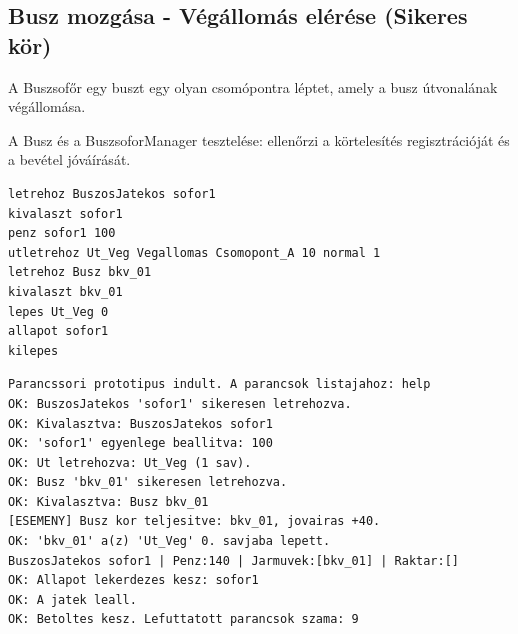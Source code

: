 \subsection{Busz mozgása - Végállomás elérése (Sikeres kör)}
\begin{test-case-description}
    A Buszsofőr egy buszt egy olyan csomópontra léptet, amely a busz útvonalának végállomása.
\end{test-case-description}
\begin{test-case-function}
    A Busz és a BuszsoforManager tesztelése: ellenőrzi a körtelesítés regisztrációját és a bevétel jóváírását.
\end{test-case-function}
\begin{test-case-input}
\begin{verbatim}
letrehoz BuszosJatekos sofor1
kivalaszt sofor1
penz sofor1 100
utletrehoz Ut_Veg Vegallomas Csomopont_A 10 normal 1
letrehoz Busz bkv_01
kivalaszt bkv_01
lepes Ut_Veg 0
allapot sofor1
kilepes
\end{verbatim}
\end{test-case-input}
\begin{test-case-output}
\begin{verbatim}
Parancssori prototipus indult. A parancsok listajahoz: help
OK: BuszosJatekos 'sofor1' sikeresen letrehozva.
OK: Kivalasztva: BuszosJatekos sofor1
OK: 'sofor1' egyenlege beallitva: 100
OK: Ut letrehozva: Ut_Veg (1 sav).
OK: Busz 'bkv_01' sikeresen letrehozva.
OK: Kivalasztva: Busz bkv_01
[ESEMENY] Busz kor teljesitve: bkv_01, jovairas +40.
OK: 'bkv_01' a(z) 'Ut_Veg' 0. savjaba lepett.
BuszosJatekos sofor1 | Penz:140 | Jarmuvek:[bkv_01] | Raktar:[]
OK: Allapot lekerdezes kesz: sofor1
OK: A jatek leall.
OK: Betoltes kesz. Lefuttatott parancsok szama: 9
\end{verbatim}
\end{test-case-output}


